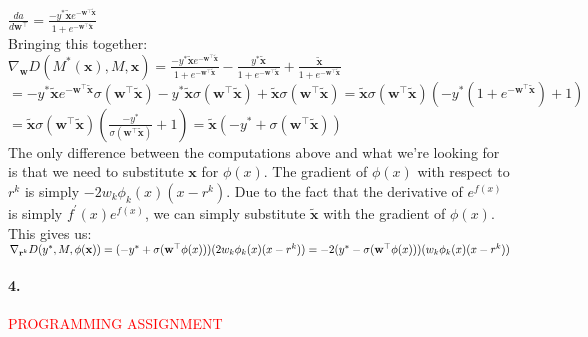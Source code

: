 \documentclass{article}
\newcommand{\vect}[1]{\mathbf{#1}}
\newcommand{\vx}[0]{\vect{x}}
\newcommand{\vw}[0]{\vect{w}}
\newcommand{\vr}[0]{\vect{r}}
\newcommand{\sigmoid}{\sigma}
\newcommand{\todo}[1]{{\Large\textcolor{red}{#1}}}
\begin{document}
$ \frac{da}{d \vw^\top} = \frac {-y^* \tilde{\vx}e^{-\vw^\top \tilde{\vx}}}{1 + e^{-\vw^\top \tilde{\vx}}}$ \\
Bringing this together: \\
$ \nabla_{\vw} D(M^*(\vx), M, \vx) =  \frac {-y^* \tilde{\vx}e^{-\vw^\top \tilde{\vx}}}{1 + e^{-\vw^\top \tilde{\vx}}} - \frac{y^* \tilde{\vx}}{1 + e^{-\vw^\top \tilde{\vx}}} + \frac{\tilde{\vx}}{1 + e^{-\vw^\top \tilde{\vx}}} $ \\
$ = -y^* \tilde{\vx}e^{-\vw^\top \tilde{\vx}} \sigmoid(\vw^\top \tilde{\vx}) -y^* \tilde{\vx}\sigmoid(\vw^\top \tilde{\vx}) + \tilde{\vx}\sigmoid(\vw^\top \tilde{\vx}) = \tilde{\vx}\sigmoid(\vw^\top \tilde{\vx}) (-y^* (1 + e^{-\vw^\top \tilde{\vx}}) + 1)$ \\
$ = \tilde{\vx}\sigmoid(\vw^\top \tilde{\vx}) (\frac{-y^* }{\sigmoid(\vw^\top \tilde{\vx})} + 1) = \tilde{\vx} (-y^* + \sigmoid(\vw^\top \tilde{\vx}))$ \\
The only difference between the computations above and what we're looking for is that we need to substitute $\vx$ for $\phi(x)$. The gradient of $\phi(x)$ with respect to $r^k$ is simply $-2 w_k \phi_k(x)(x-r^k)$. Due to the fact that the derivative of $e^{f(x)}$ is simply $f^{'}(x)e^{f(x)}$, we can simply substitute $\tilde{\vx}$ with the gradient of $\phi(x)$. This gives us: \\
$\nabla_{\vr^k} D(y^*, M, \phi(\vx)) =  (-y^* + \sigmoid(\vw^\top \phi(x)))(2 w_k \phi_k(x)(x-r^k)) \\
= -2(y^* - \sigmoid(\vw^\top \phi(x)))(w_k \phi_k(x)(x-r^k))$
\vspace{30mm}

\paragraph{4.} \todo{PROGRAMMING ASSIGNMENT}





%
%
\end{document}
